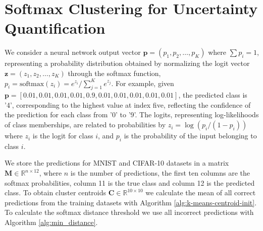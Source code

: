 

\section{Softmax Clustering for Uncertainty Quantification}
\label{methods:clustering}

\sloppy

We consider a neural network output vector $\mathbf{p} = (p_1, p_2, \dots, p_K)$ where $\sum p_i = 1$, representing a probability distribution obtained by normalizing the logit vector $\mathbf{z} = (z_1, z_2, \dots, z_K)$ through the softmax function, $p_i = \text{softmax}(z_i) = e^{z_i} / \sum_{j=1}^{K} e^{z_j}$. For example, given $\mathbf{p} = [0.01, 0.01, 0.01, 0.01, 0.9, 0.01, 0.01, 0.01, 0.01, 0.01]$, the predicted class is '4', corresponding to the highest value at index five, reflecting the confidence of the prediction for each class from '0' to '9'. The logits, representing log-likelihoods of class memberships, are related to probabilities by $z_i = \log (p_i / (1 - p_i))$ where $z_i$ is the logit for class $i$, and $p_i$ is the probability of the input belonging to class $i$.

We store the predictions for MNIST and CIFAR-10 datasets in a matrix $\mathbf{M} \in \mathbb{R}^{n \times 12}$, where $n$ is the number of predictions, the first ten columns are the softmax probabilities, column 11 is the true class and column 12 is the predicted class.
To obtain cluster centroids $\mathbf{C} \in \mathbb{R}^{10 \times 10}$ we calculate the mean of all correct predictions from the training datasets with Algorithm \ref{alg:k-means-centroid-init}. To calculate the softmax distance threshold we use all incorrect predictions with Algorithm \ref{alg:min_distance}.

